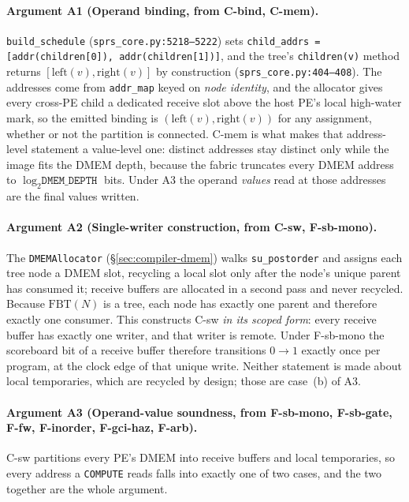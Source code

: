 \documentclass[journal,10pt]{IEEEtran}
\theoremstyle{plain}
\theoremstyle{definition}
\theoremstyle{remark}
\newcommand{\FBT}{\ensuremath{\mathrm{FBT}}}
\newcommand{\sv}[1]{\texttt{#1}}
\begin{document}
\paragraph{Argument A1 (Operand binding, from \textsf{C-bind},
\textsf{C-mem}).}
\sv{build\_schedule} (\sv{sprs\_core.py:5218--5222}) sets
\sv{child\_addrs = [addr(children[0]), addr(children[1])]}, and the tree's
\sv{children(v)} method returns $[\mathrm{left}(v), \mathrm{right}(v)]$ by
construction (\sv{sprs\_core.py:404--408}). The addresses come from
\sv{addr\_map} keyed on \emph{node identity}, and the allocator gives every
cross-PE child a dedicated receive slot above the host PE's local
high-water mark, so the emitted binding is $(\mathrm{left}(v),
\mathrm{right}(v))$ for any assignment, whether or not the partition is
connected. \textsf{C-mem} is what makes that address-level statement a
value-level one: distinct addresses stay distinct only while the image fits
the DMEM depth, because the fabric truncates every DMEM address to
$\log_2\sv{DMEM\_DEPTH}$ bits. Under A3 the operand \emph{values} read at
those addresses are the final values written.

\paragraph{Argument A2 (Single-writer construction, from \textsf{C-sw},
\textsf{F-sb-mono}).}
The \sv{DMEMAllocator} (\S\ref{sec:compiler-dmem}) walks \sv{su\_postorder}
and assigns each tree node a DMEM slot, recycling a local slot only after
the node's unique parent has consumed it; receive buffers are allocated in
a second pass and never recycled. Because $\FBT(N)$ is a tree, each node
has exactly one parent and therefore exactly one consumer. This constructs
\textsf{C-sw} \emph{in its scoped form}: every receive buffer has exactly
one writer, and that writer is remote. Under \textsf{F-sb-mono} the
scoreboard bit of a receive buffer therefore transitions $0 \to 1$ exactly
once per program, at the clock edge of that unique write. Neither statement
is made about local temporaries, which are recycled by design; those are
case~(b) of A3.

\paragraph{Argument A3 (Operand-value soundness, from \textsf{F-sb-mono},
\textsf{F-sb-gate}, \textsf{F-fw}, \textsf{F-inorder},
\textsf{F-gci-haz}, \textsf{F-arb}).}
\textsf{C-sw} partitions every PE's DMEM into receive buffers and local
temporaries, so every address a \texttt{COMPUTE} reads falls into exactly
one of two cases, and the two together are the whole argument.
\end{document}
